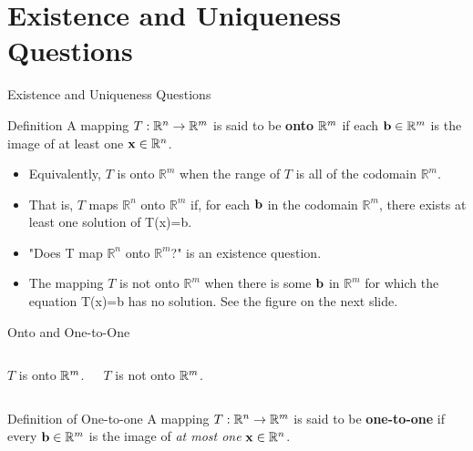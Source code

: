 \section[Existence]{Existence and Uniqueness Questions}
\begin{frame}{Existence and Uniqueness Questions}
\begin{block}{Definition}
A mapping $T:\mathbb{R}^n\to\mathbb{R}^m$ is said to be \textbf{onto} $\mathbb{R}^m$ if each
$\mathbf{b}\in\mathbb{R}^m$ is the image of at least one $\mathbf{x}\in\mathbb{R}^n$.
\end{block}

\begin{itemize}
  \item Equivalently, $T$ is onto $\mathbb{R}^m$ when the range of $T$ is all of the codomain $\mathbb{R}^m$. 
  \item That is, $T$ maps $\mathbb{R}^n$ onto $\mathbb{R}^m$ if, for each $\mathbf{b}$ in the codomain $\mathbb{R}^m$, there exists at least one solution of T(x)=b. 
  \item "Does T map $\mathbb{R}^n$ onto $\mathbb{R}^m$?" is an existence question.
  \item The mapping $T$ is not onto $\mathbb{R}^m$ when there is some $\mathbf{b}$ in $\mathbb{R}^m$ for which the equation T(x)=b has no solution. See the figure on the next slide. 
\end{itemize}
\end{frame}

\begin{frame}{Onto and One-to-One}
\begin{columns}[T]
\centering
{}

\scriptsize $T$ is onto $\mathbb{R}^m$.
\centering
{}

\scriptsize $T$ is not onto $\mathbb{R}^m$.
\end{columns}
\medskip
\begin{block}{Definition of One-to-one}
A mapping $T:\mathbb{R}^n\to\mathbb{R}^m$ is said to be \textbf{one-to-one} if every
$\mathbf{b}\in\mathbb{R}^m$ is the image of \textit{at most one} $\mathbf{x}\in\mathbb{R}^n$.
\end{block}
\end{frame}

